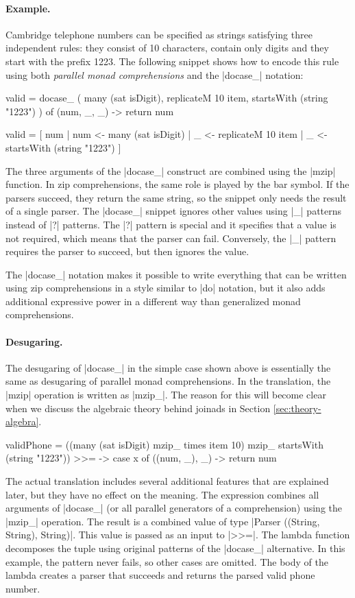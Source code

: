 \documentclass{sigplanconf}
\begin{document}
\paragraph{Example.}
Cambridge telephone numbers can be specified as strings satisfying three independent rules: 
they consist of 10 characters, contain only digits and they start with the prefix 1223. The following
snippet shows how to encode this rule using both \textit{parallel monad comprehensions} and 
the |docase_| notation:

\begin{code}
valid = docase_ (  many (sat isDigit), 
                   replicateM 10 item,
                   startsWith (string "1223") )
  of (num, _, _) -> return num

valid = [ num  | num  <- many (sat isDigit) 
               | _    <- replicateM 10 item
               | _    <- startsWith (string "1223") ]
\end{code}
The three arguments of the |docase_| construct are combined using the |mzip| function. In zip 
comprehensions, the same role is played by the bar symbol. If the parsers succeed, they 
return the same string, so the snippet only needs the result of a single parser.
The |docase_| snippet ignores other values using |_| patterns instead of |?| patterns.
The |?| pattern is special and it specifies that a value is not required, which 
means that the parser can fail. Conversely, the |_| pattern requires the parser to 
succeed, but then ignores the value. 

The |docase_| notation makes it possible to write everything that can be written using 
zip comprehensions in a style similar to |do| notation, but it also adds additional expressive 
power in a different way than generalized monad comprehensions.
 
\paragraph{Desugaring.}
The desugaring of |docase_| in the simple case shown above is essentially the same as desugaring 
of parallel monad comprehensions. In the translation, the |mzip| operation is written as |mzip_|. 
The reason for this will become clear when we discuss the algebraic theory behind joinads 
in Section \ref{sec:theory-algebra}.

\begin{code}
validPhone = 
    ((many (sat isDigit) mzip_ times item 10) 
        mzip_ startsWith (string "1223")) >>= \x ->
            case x of ((num, _), _) -> return num
\end{code}
The actual translation includes several additional features that are explained later, but
they have no effect on the meaning. The expression combines all arguments of |docase_| 
(or all parallel generators of a comprehension) using the |mzip_| operation. The result is 
a combined value of type |Parser ((String, String), String)|. This value is passed as an input to 
|>>=|. The lambda function decomposes the tuple using original patterns of the |docase_| 
alternative. In this example, the pattern never fails, so other cases are omitted. The body of 
the lambda creates a parser that succeeds and returns the parsed valid phone number.
\end{document}

